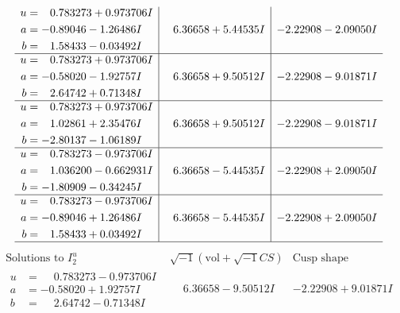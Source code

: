 \documentclass[1p]{elsarticle_modified}
\theoremstyle{definition}
\newcommand{\I}{\sqrt{-1}}
\begin{document}
$$\begin{array}{c|c|c}
\begin{aligned}
u &= \phantom{-}0.783273 + 0.973706 I \\
a &= -0.89046 - 1.26486 I \\
b &= \phantom{-}1.58433 - 0.03492 I\end{aligned}
 & \phantom{-}6.36658 + 5.44535 I & -2.22908 - 2.09050 I \\ \hline\begin{aligned}
u &= \phantom{-}0.783273 + 0.973706 I \\
a &= -0.58020 - 1.92757 I \\
b &= \phantom{-}2.64742 + 0.71348 I\end{aligned}
 & \phantom{-}6.36658 + 9.50512 I & -2.22908 - 9.01871 I \\ \hline\begin{aligned}
u &= \phantom{-}0.783273 + 0.973706 I \\
a &= \phantom{-}1.02861 + 2.35476 I \\
b &= -2.80137 - 1.06189 I\end{aligned}
 & \phantom{-}6.36658 + 9.50512 I & -2.22908 - 9.01871 I \\ \hline\begin{aligned}
u &= \phantom{-}0.783273 - 0.973706 I \\
a &= \phantom{-}1.036200 - 0.662931 I \\
b &= -1.80909 - 0.34245 I\end{aligned}
 & \phantom{-}6.36658 - 5.44535 I & -2.22908 + 2.09050 I \\ \hline\begin{aligned}
u &= \phantom{-}0.783273 - 0.973706 I \\
a &= -0.89046 + 1.26486 I \\
b &= \phantom{-}1.58433 + 0.03492 I\end{aligned}
 & \phantom{-}6.36658 - 5.44535 I & -2.22908 + 2.09050 I\\
 \hline 
 \end{array}$$\newpage$$\begin{array}{c|c|c}  
\text{Solutions to }I^u_{2}& \I (\text{vol} + \sqrt{-1}CS) & \text{Cusp shape}\\
 \hline 
\begin{aligned}
u &= \phantom{-}0.783273 - 0.973706 I \\
a &= -0.58020 + 1.92757 I \\
b &= \phantom{-}2.64742 - 0.71348 I\end{aligned}
 & \phantom{-}6.36658 - 9.50512 I & -2.22908 + 9.01871 I \\ \hline\begin{aligned}

\end{aligned}
\end{array}$$
\end{document}
